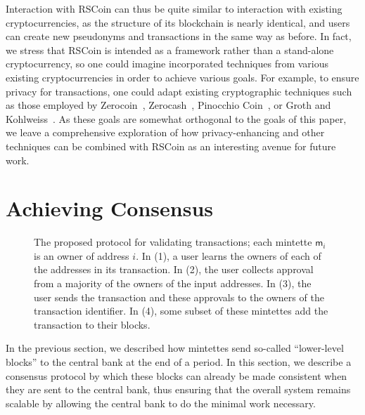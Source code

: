 \documentclass[conference]{IEEEtran}
\newcommand{\rscoin}{\textsf{RSCoin}\xspace}
\newcommand{\mintette}{\mathsf{m}}
\begin{document}
Interaction with \rscoin can thus be quite
similar to interaction with existing cryptocurrencies, as the structure of its
blockchain is nearly identical, and users can create new pseudonyms and
transactions in the same way as before.  In fact, we stress that \rscoin is
intended as a framework rather than a stand-alone cryptocurrency, so one could
imagine incorporated techniques from various existing cryptocurrencies in
order to achieve various goals.  For example, to ensure privacy for
transactions, one could adapt existing cryptographic techniques such as those
employed by Zerocoin~\cite{DBLP:conf/sp/MiersG0R13},
Zerocash~\cite{DBLP:conf/sp/Ben-SassonCG0MTV14}, Pinocchio
Coin~\cite{DBLP:conf/ccs/DanezisFKP13}, or Groth and
Kohlweiss~\cite{DBLP:conf/eurocrypt/GrothK15}.  As these goals are somewhat
orthogonal to the goals of this paper, we leave a comprehensive exploration of
how privacy-enhancing and other techniques can be combined with \rscoin as an
interesting avenue for future work.

\section{Achieving Consensus}\label{sec:consensus}

\begin{figure}[t]
\centering
{}\fi
\caption{The proposed protocol for validating transactions; each mintette
$\mintette_i$ is an owner of address $i$.  In (1), a user learns the owners of
each of the addresses in its transaction.  In (2), the user collects approval
from a majority of the owners of the input addresses.  In (3), the user sends
the transaction and these approvals to the owners of the transaction
identifier.  In (4), some subset of these mintettes add the transaction to
their blocks.}
\label{fig:txvalidation}
\end{figure}

In the previous section, we described how mintettes send so-called
``lower-level blocks'' to the central bank at the end of a period.  In this
section, we describe a consensus protocol by which these blocks can already
be made consistent when they are sent to the central bank, thus ensuring that
the overall system remains scalable by allowing the central bank to do
the minimal work necessary.
\end{document}
